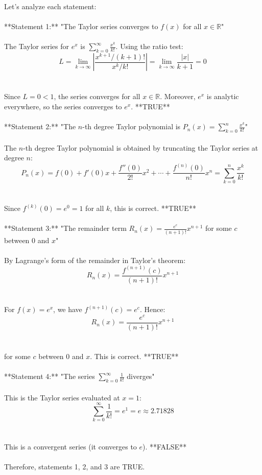 \documentclass[11pt]{article}
\begin{document}
Let's analyze each statement:\\
\\
**Statement 1:** "The Taylor series converges to \(f(x)\) for all \(x \in \mathbb{R}\)"\\
\\
The Taylor series for \(e^x\) is \(\sum_{k=0}^{\infty} \frac{x^k}{k!}\). Using the ratio test:\\
\[L = \lim_{k \to \infty} \left| \frac{x^{k+1}/(k+1)!}{x^k/k!} \right| = \lim_{k \to \infty} \frac{|x|}{k+1} = 0\]\\
\\
Since \(L = 0 < 1\), the series converges for all \(x \in \mathbb{R}\). Moreover, \(e^x\) is analytic everywhere, so the series converges to \(e^x\). **TRUE**\\
\\
**Statement 2:** "The \(n\)-th degree Taylor polynomial is \(P_n(x) = \sum_{k=0}^{n} \frac{x^k}{k!}\)"\\
\\
The \(n\)-th degree Taylor polynomial is obtained by truncating the Taylor series at degree \(n\):\\
\[P_n(x) = f(0) + f'(0)x + \frac{f''(0)}{2!}x^2 + \cdots + \frac{f^{(n)}(0)}{n!}x^n = \sum_{k=0}^{n} \frac{x^k}{k!}\]\\
\\
Since \(f^{(k)}(0) = e^0 = 1\) for all \(k\), this is correct. **TRUE**\\
\\
**Statement 3:** "The remainder term \(R_n(x) = \frac{e^c}{(n+1)!} x^{n+1}\) for some \(c\) between \(0\) and \(x\)"\\
\\
By Lagrange's form of the remainder in Taylor's theorem:\\
\[R_n(x) = \frac{f^{(n+1)}(c)}{(n+1)!} x^{n+1}\]\\
\\
For \(f(x) = e^x\), we have \(f^{(n+1)}(c) = e^c\). Hence:\\
\[R_n(x) = \frac{e^c}{(n+1)!} x^{n+1}\]\\
\\
for some \(c\) between \(0\) and \(x\). This is correct. **TRUE**\\
\\
**Statement 4:** "The series \(\sum_{k=0}^{\infty} \frac{1}{k!}\) diverges"\\
\\
This is the Taylor series evaluated at \(x = 1\):\\
\[\sum_{k=0}^{\infty} \frac{1}{k!} = e^1 = e \approx 2.71828\]\\
\\
This is a convergent series (it converges to \(e\)). **FALSE**\\
\\
Therefore, statements 1, 2, and 3 are TRUE.
\end{document}
